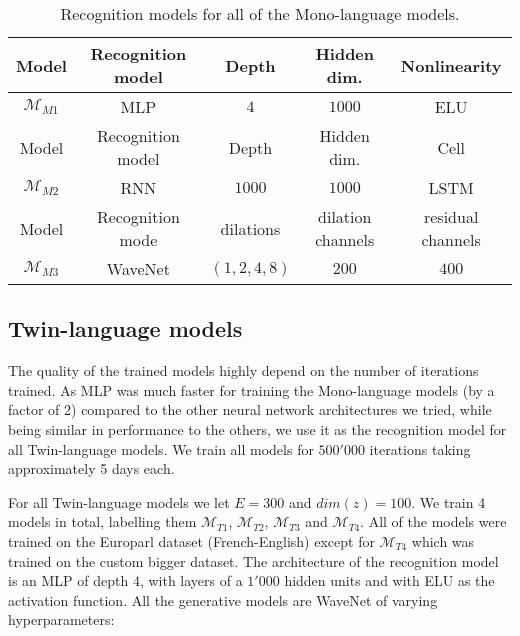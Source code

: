 \begin{table}[!htbp]
  \centering
  \begin{tabular}{|c|c|c|c|c|}
    \hline
    Model & Recognition model & Depth & Hidden dim. & Nonlinearity \\ [0.5ex] 
    \hline\hline
    $\mathcal{M}_{M1}$ & MLP & $4$ & $1000$ & ELU \\ 
    \hline\hline
    Model & Recognition model & Depth & Hidden dim. & Cell \\
    \hline\hline
    $\mathcal{M}_{M2}$ & RNN  & $1000$ & $1000$ & LSTM \\
    \hline\hline
    Model & Recognition mode & dilations & dilation channels & residual channels \\
    \hline\hline
    $\mathcal{M}_{M3}$ & WaveNet & $(1, 2, 4, 8)$ & $200$ & $400$ \\
    \hline
  \end{tabular}
  \caption{Recognition models for all of the Mono-language models.}
  \label{results:Mono_lang_recog_models}
\end{table}

\subsection{Twin-language models}
The quality of the trained models highly depend on the number of iterations
trained. As MLP was much faster for training the Mono-language models (by a
factor of 2) compared to the other neural network architectures we tried, while
being similar in performance to the others, we use it as the recognition model
for all Twin-language models. We train all models for $500'000$ iterations
taking approximately 5 days each.

For all Twin-language models we let $E = 300$ and $dim(z) = 100$. We train 4
models in total, labelling them $\mathcal{M}_{T1}$, $\mathcal{M}_{T2}$,
$\mathcal{M}_{T3}$ and $\mathcal{M}_{T4}$. All of the models were trained on the
Europarl dataset (French-English) except for $\mathcal{M}_{T4}$ which was
trained on the custom bigger dataset. The architecture of the recognition model is
an MLP of depth $4$, with layers of a $1'000$ hidden units and with ELU as the activation
function. All the generative models are WaveNet of varying hyperparameters:

